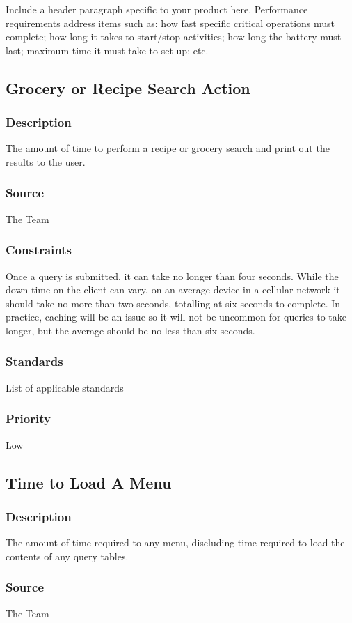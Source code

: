Include a header paragraph specific to your product here. Performance requirements address items such as: how fast specific critical operations must complete; how long it takes to start/stop activities; how long the battery must last; maximum time it must take to set up; etc.

\subsection{Grocery or Recipe Search Action}
\subsubsection{Description}
The amount of time to perform a recipe or grocery search and print out the results to the user.
\subsubsection{Source}
The Team
\subsubsection{Constraints}
Once a query is submitted, it can take no longer than four seconds.  
While the down time on the client can vary, on an average device in a cellular network it should take no more than two seconds, totalling at six seconds to complete.
In practice, caching will be an issue so it will not be uncommon for queries to take longer, but the average should be no less than six seconds.
\subsubsection{Standards}
List of applicable standards
\subsubsection{Priority}
Low

\subsection{Time to Load A Menu}
\subsubsection{Description}
The amount of time required to any menu, discluding time required to load the contents of any query tables.
\subsubsection{Source}
The Team
